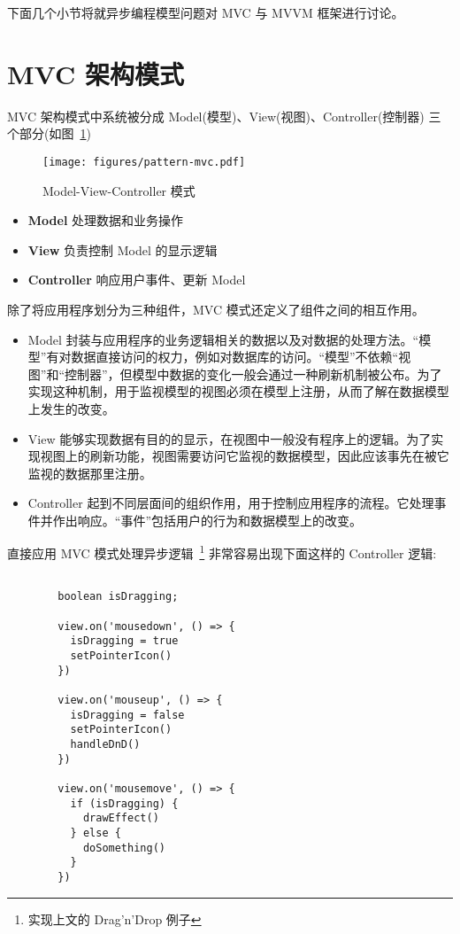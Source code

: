 下面几个小节将就异步编程模型问题对 MVC 与 MVVM 框架进行讨论。

\section{MVC 架构模式}

MVC 架构模式中系统被分成 Model(模型)、View(视图)、Controller(控制器) 三个部分(如图~\ref{PatternMVC})

\begin{figure}[!h]
  \begin{center}
    \texttt{[image: figures/pattern-mvc.pdf]}
    \caption{Model-View-Controller 模式\label{PatternMVC}}
  \end{center}
\end{figure}

\begin{itemize}
  \item \textbf{Model} 处理数据和业务操作
  \item \textbf{View} 负责控制 Model 的显示逻辑
  \item \textbf{Controller} 响应用户事件、更新 Model
\end{itemize}

除了将应用程序划分为三种组件，MVC 模式还定义了组件之间的相互作用。

\begin{itemize}
  \item Model 封装与应用程序的业务逻辑相关的数据以及对数据的处理方法。“模型”有对数据直接访问的权力，例如对数据库的访问。“模型”不依赖“视图”和“控制器”，但模型中数据的变化一般会通过一种刷新机制被公布。为了实现这种机制，用于监视模型的视图必须在模型上注册，从而了解在数据模型上发生的改变。
  \item View 能够实现数据有目的的显示，在视图中一般没有程序上的逻辑。为了实现视图上的刷新功能，视图需要访问它监视的数据模型，因此应该事先在被它监视的数据那里注册。
  \item Controller 起到不同层面间的组织作用，用于控制应用程序的流程。它处理事件并作出响应。“事件”包括用户的行为和数据模型上的改变。
\end{itemize}

直接应用 MVC 模式处理异步逻辑~\footnote{实现上文的 Drag'n'Drop 例子} 非常容易出现下面这样的 Controller 逻辑:

\begin{verbatim}

        boolean isDragging;

        view.on('mousedown', () => {
          isDragging = true
          setPointerIcon()
        })

        view.on('mouseup', () => {
          isDragging = false
          setPointerIcon()
          handleDnD()
        })

        view.on('mousemove', () => {
          if (isDragging) {
            drawEffect()
          } else {
            doSomething()
          }
        })

\end{verbatim}

